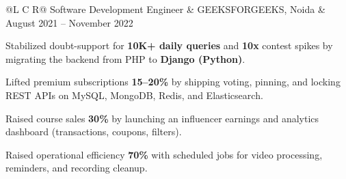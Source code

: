 \vspace{0.15ex}
\noindent
\begin{tabularx}{\textwidth}{@{}L C R@{}}
\textcolor{role}{Software Development Engineer} & \textcolor{company}{GEEKSFORGEEKS, Noida} & \textcolor{date}{August 2021 -- November 2022}\\
\end{tabularx}
\vspace{-3ex}
\begin{zitemize}
    \item Stabilized doubt-support for \textbf{10K+ daily queries} and \textbf{10x} contest spikes by migrating the backend from PHP to \textbf{Django (Python)}.
    \item Lifted premium subscriptions \textbf{15--20\%} by shipping voting, pinning, and locking REST APIs on MySQL, MongoDB, Redis, and Elasticsearch.
    \item Raised course sales \textbf{30\%} by launching an influencer earnings and analytics dashboard (transactions, coupons, filters).
    \item Raised operational efficiency \textbf{70\%} with scheduled jobs for video processing, reminders, and recording cleanup.
\end{zitemize}
